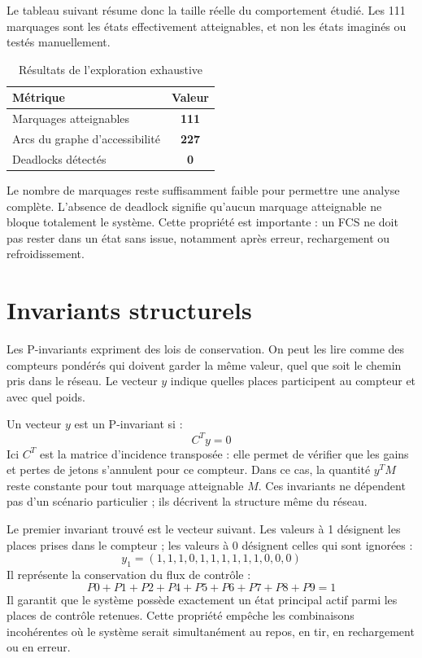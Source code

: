 \documentclass[11pt,a4paper]{report}
\begin{document}
Le tableau suivant résume donc la taille réelle du comportement étudié. Les 111 marquages sont les états effectivement atteignables, et non les états imaginés ou testés manuellement.

\begin{table}[H]
\centering
\caption{Résultats de l'exploration exhaustive}
\begin{tabularx}{0.7\textwidth}{YC}
\toprule
Métrique & Valeur \\
\midrule
Marquages atteignables & \textbf{111} \\
Arcs du graphe d'accessibilité & \textbf{227} \\
Deadlocks détectés & \textbf{0} \\
\bottomrule
\end{tabularx}
\end{table}

Le nombre de marquages reste suffisamment faible pour permettre une analyse complète. L'absence de deadlock signifie qu'aucun marquage atteignable ne bloque totalement le système. Cette propriété est importante : un FCS ne doit pas rester dans un état sans issue, notamment après erreur, rechargement ou refroidissement.

\section{Invariants structurels}
Les P-invariants expriment des lois de conservation. On peut les lire comme des compteurs pondérés qui doivent garder la même valeur, quel que soit le chemin pris dans le réseau. Le vecteur $y$ indique quelles places participent au compteur et avec quel poids.

Un vecteur $y$ est un P-invariant si :
\[
C^T y = 0
\]
Ici $C^T$ est la matrice d'incidence transposée : elle permet de vérifier que les gains et pertes de jetons s'annulent pour ce compteur. Dans ce cas, la quantité $y^T M$ reste constante pour tout marquage atteignable $M$. Ces invariants ne dépendent pas d'un scénario particulier ; ils décrivent la structure même du réseau.

Le premier invariant trouvé est le vecteur suivant. Les valeurs à 1 désignent les places prises dans le compteur ; les valeurs à 0 désignent celles qui sont ignorées :
\[
y_1 = (1,1,1,0,1,1,1,1,1,1,0,0,0)
\]
Il représente la conservation du flux de contrôle :
\[
P0 + P1 + P2 + P4 + P5 + P6 + P7 + P8 + P9 = 1
\]
Il garantit que le système possède exactement un état principal actif parmi les places de contrôle retenues. Cette propriété empêche les combinaisons incohérentes où le système serait simultanément au repos, en tir, en rechargement ou en erreur.
\end{document}

